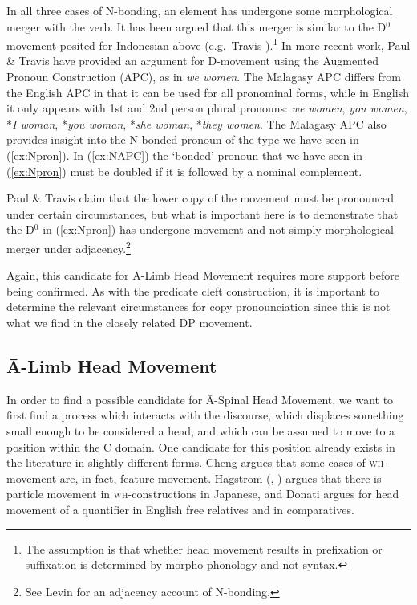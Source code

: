 \documentclass[output=paper,colorlinks,citecolor=brown,
]{langscibook}
\begin{document}
In all three cases of N-bonding, an element has undergone some morphological merger with the verb. It has been argued that this merger is similar to the D$^0$ movement posited for Indonesian above (e.g.\ Travis \citeyear{Travis:2006}).\footnote{The assumption is that whether head movement results in prefixation or suffixation is determined by morpho-phonology and not syntax.}  In more recent work, Paul \& Travis \citeyearpar{Paul:2019} have provided an argument for D-movement using the Augmented Pronoun Construction (APC), as in \textit{we women}.  The Malagasy APC differs from the English APC in that it can be used for all pronominal forms, while in English it only appears with 1st and 2nd person plural pronouns: \textit{we women}, \textit{you women}, *\textit{I woman}, *\textit{you woman}, *\textit{she woman}, *\textit{they women}.  The Malagasy APC also provides insight into the N-bonded pronoun of the type we have seen in (\ref{ex:Npron}).  In (\ref{ex:NAPC}) the 	`bonded' pronoun that we have seen in (\ref{ex:Npron}) must be doubled if it is followed by a nominal complement.

\z

Paul \& Travis claim that the lower copy of the movement must be pronounced under certain circumstances, but what is important here is to demonstrate that the D$^0$ in (\ref{ex:Npron}) has undergone movement and not simply morphological merger under adjacency.\footnote{See Levin \citeyearpar{Levin:2015} for an adjacency account of N-bonding.}

Again, this candidate for A-Limb Head Movement requires more support before being confirmed. As with the predicate cleft construction, it is important to determine the relevant circumstances for copy pronounciation since this is not what we find in the closely related DP movement.

\subsection{\=A-Limb Head Movement}

In order to find a possible candidate for \=A-Spinal Head Movement, we want to first find a process which interacts with the discourse, which displaces something small enough to be considered a head, and which can be assumed to move to a position within the C domain.  One candidate for this position already exists in the literature in slightly different forms.  Cheng \citeyearpar{Cheng:2000b} argues that some cases of \textsc{wh-}movement are, in fact,  feature movement.  Hagstrom (\citeyear{Hagstrom:2000}, \citeyear{Hagstrom:2004}) argues that there is particle movement in \textsc{wh}-constructions in Japanese,  and Donati \citeyearpar{Donati:2006} argues for head movement of a quantifier in English free relatives and in comparatives.  
\end{document}
